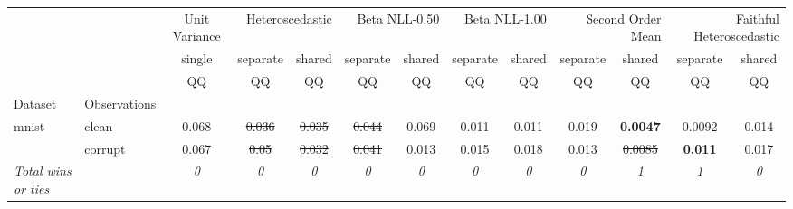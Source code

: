 \begin{tabular}{ll|c|cc|cc|cc|cc|cc}
\toprule
{} & {} & {Unit Variance} & \multicolumn{2}{r}{Heteroscedastic} & \multicolumn{2}{r}{Beta NLL-0.50} & \multicolumn{2}{r}{Beta NLL-1.00} & \multicolumn{2}{r}{Second Order Mean} & \multicolumn{2}{r}{Faithful Heteroscedastic} \\
{} & {} & {single} & {separate} & {shared} & {separate} & {shared} & {separate} & {shared} & {separate} & {shared} & {separate} & {shared} \\
{} & {} & {QQ} & {QQ} & {QQ} & {QQ} & {QQ} & {QQ} & {QQ} & {QQ} & {QQ} & {QQ} & {QQ} \\
{Dataset} & {Observations} & {} & {} & {} & {} & {} & {} & {} & {} & {} & {} & {} \\
\midrule
\multirow[t]{2}{*}{mnist} & clean & 0.068 & \sout{0.036} & \sout{0.035} & \sout{0.044} & 0.069 & 0.011 & 0.011 & 0.019 & \textbf{0.0047} & 0.0092 & 0.014 \\
 & corrupt & 0.067 & \sout{0.05} & \sout{0.032} & \sout{0.041} & 0.013 & 0.015 & 0.018 & 0.013 & \sout{0.0085} & \textbf{0.011} & 0.017 \\
\textit{{Total wins or ties}} &  & \textit{0} & \textit{0} & \textit{0} & \textit{0} & \textit{0} & \textit{0} & \textit{0} & \textit{0} & \textit{1} & \textit{1} & \textit{0} \\
\bottomrule
\end{tabular}

